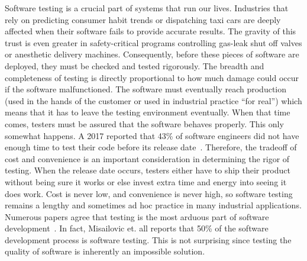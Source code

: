 
Software testing is a crucial part of systems that run our lives. Industries that rely on predicting consumer habit trends or dispatching taxi cars are deeply affected when their software fails to provide accurate results. The gravity of this trust is even greater in safety-critical programs controlling gas-leak shut off valves or anesthetic delivery machines. Consequently, before these pieces of software are deployed, they must be checked and tested rigorously. The breadth and completeness of testing is directly proportional to how much damage could occur if the software malfunctioned. The software must eventually reach production (used in the hands of the customer or used in industrial practice ``for real'') which means that it has to leave the testing environment eventually. When that time comes, testers must be assured that the software behaves properly. This only somewhat happens. A 2017 reported that 43\% of software engineers did not have enough time to test their code before its release date~\cite{Kassab-deFranco-Laplante}. Therefore, the tradeoff of cost and convenience is an important consideration in determining the rigor of testing. When the release date occurs, testers either have to ship their product without being sure it works or else invest extra time and energy into seeing it does work. Cost is never low, and convenience is never high, so software testing remains a lengthy and sometimes ad hoc practice in many industrial applications. Numerous papers agree that  testing is the most arduous part of software development~\cite{Murphy:2007:PRT:1292414.1292425,Haller:2010:TDC:1838126.1838132,Muslu:2015:PDE:2771783.2771792,Tiwari:2013:RRT:2439976.2439982,Gupta:2011:MBA:2002931.2002932,Zeller:2017:STS:3105427.3105438,Garousi:2017:IWA:3084226.3084264,Kassab-deFranco-Laplante,Langdon:2017:IAT:3105427.3105429,Goffi:2016:AGO:2931037.2931061}.  In fact, Misailovic et. all reports that 50\% of the software development process is software testing. This is not surprising since testing the quality of software is inherently an impossible solution.

